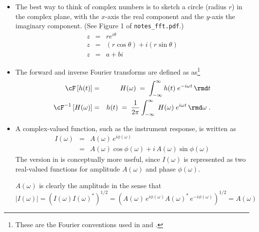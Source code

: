 \documentclass[11pt,titlepage,fleqn]{article}
\newcommand{\fft}{h}
\newcommand{\ffw}{H}
\begin{document}
\begin{itemize}
\item The best way to think of complex numbers is to sketch a circle (radius $r$) in the complex plane, with the $x$-axis the real component and the $y$-axis the imaginary component. (See Figure 1 of \verb+notes_fft.pdf+.)
%
\begin{eqnarray*}
z &=& r e^{i\theta}
\\
z &=& (r\cos\theta) + i(r\sin\theta)
\\
z &=& a + bi
\end{eqnarray*}



\item The forward and inverse Fourier transforms are defined as as\footnote{These are the Fourier conventions used in \citet[][p.~109]{DT} and \citet[][Section 6.4.2]{SteinWysession}.}
%
\begin{eqnarray}
\cF \left[ \fft(t) \right] &=& \ffw(\omega)
\;=\; \int_{-\infty}^{\infty} \fft(t) \; e^{-i\omega t} \,\rmd t
\label{fft}
\\
\cF^{-1} \left[ \ffw(\omega) \right] &=& \fft(t) 
\;=\; \frac{1}{2\pi} \int_{-\infty}^{\infty} \; \ffw(\omega) \; e^{i\omega t} \,\rmd\omega 
\label{ifft}
\;.
\end{eqnarray}


\item A complex-valued function, such as the instrument response, is written as
%
\begin{eqnarray}
I(\omega) &=& A(\omega)\,e^{i\phi(\omega)}
\label{Iw}
\\
&=& A(\omega)\cos\phi(\omega) + i\,A(\omega)\sin\phi(\omega)
\end{eqnarray}
%
The version in  is conceptually more useful, since $I(\omega)$ is represented as two real-valued functions for amplitude $A(\omega)$ and phase $\phi(\omega)$.

$A(\omega)$ is clearly the amplitude in the sense that
%
\begin{equation}
|I(\omega)| = \left( I(\omega) I(\omega)^* \right)^{1/2}
= \left( A(\omega)\,e^{i\phi(\omega)} A(\omega)^*\,e^{-i\phi(\omega)} \right)^{1/2}
= A(\omega)
\end{equation}

\end{itemize}

\end{document}
